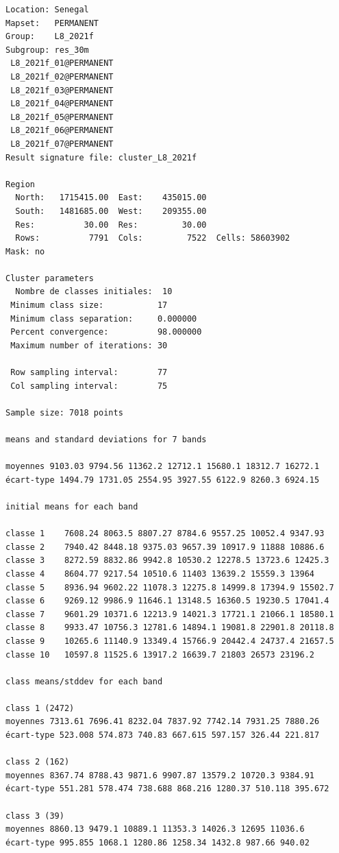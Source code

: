 \documentclass[earth,article,submit,pdftex,moreauthors]{Definitions/mdpi}
\begin{document}
{\begin{scriptsize}
\begin{verbatim}
Location: Senegal
Mapset:   PERMANENT
Group:    L8_2021f
Subgroup: res_30m
 L8_2021f_01@PERMANENT
 L8_2021f_02@PERMANENT
 L8_2021f_03@PERMANENT
 L8_2021f_04@PERMANENT
 L8_2021f_05@PERMANENT
 L8_2021f_06@PERMANENT
 L8_2021f_07@PERMANENT
Result signature file: cluster_L8_2021f

Region
  North:   1715415.00  East:    435015.00
  South:   1481685.00  West:    209355.00
  Res:          30.00  Res:         30.00
  Rows:          7791  Cols:         7522  Cells: 58603902
Mask: no

Cluster parameters
  Nombre de classes initiales: 	10
 Minimum class size:           17
 Minimum class separation:     0.000000
 Percent convergence:          98.000000
 Maximum number of iterations: 30

 Row sampling interval:        77
 Col sampling interval:        75

Sample size: 7018 points

means and standard deviations for 7 bands

moyennes 9103.03 9794.56 11362.2 12712.1 15680.1 18312.7 16272.1
écart-type 1494.79 1731.05 2554.95 3927.55 6122.9 8260.3 6924.15

initial means for each band

classe 1    7608.24 8063.5 8807.27 8784.6 9557.25 10052.4 9347.93
classe 2    7940.42 8448.18 9375.03 9657.39 10917.9 11888 10886.6
classe 3    8272.59 8832.86 9942.8 10530.2 12278.5 13723.6 12425.3
classe 4    8604.77 9217.54 10510.6 11403 13639.2 15559.3 13964
classe 5    8936.94 9602.22 11078.3 12275.8 14999.8 17394.9 15502.7
classe 6    9269.12 9986.9 11646.1 13148.5 16360.5 19230.5 17041.4
classe 7    9601.29 10371.6 12213.9 14021.3 17721.1 21066.1 18580.1
classe 8    9933.47 10756.3 12781.6 14894.1 19081.8 22901.8 20118.8
classe 9    10265.6 11140.9 13349.4 15766.9 20442.4 24737.4 21657.5
classe 10   10597.8 11525.6 13917.2 16639.7 21803 26573 23196.2

class means/stddev for each band

class 1 (2472)
moyennes 7313.61 7696.41 8232.04 7837.92 7742.14 7931.25 7880.26
écart-type 523.008 574.873 740.83 667.615 597.157 326.44 221.817

class 2 (162)
moyennes 8367.74 8788.43 9871.6 9907.87 13579.2 10720.3 9384.91
écart-type 551.281 578.474 738.688 868.216 1280.37 510.118 395.672

class 3 (39)
moyennes 8860.13 9479.1 10889.1 11353.3 14026.3 12695 11036.6
écart-type 995.855 1068.1 1280.86 1258.34 1432.8 987.66 940.02


\end{verbatim}
\end{scriptsize}}
\end{document}
